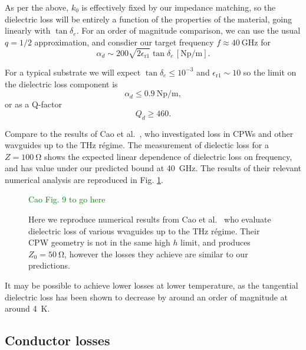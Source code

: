 \documentclass[a4paper]{article}
\newcommand{\ph}[1]{\textcolor{green}{#1}} %
\begin{document}
As per the above, $k_0$ is effectively fixed by our impedance matching, so the
dielectric loss will be entirely a function of the properties of the material,
going linearly with $\tan\delta_e$. For an order of magnitude comparison, we can
use the usual $q=1/2$ approximation, and consdier our target frequency
$f\approx\SI{40}{\giga\hertz}$ for
\begin{equation}
  \alpha_d \sim 200\sqrt{2\epsilon_\mathrm{r1}}\tan\delta_e
  \,[\si{\neper\per\meter}].
\end{equation}

For a typical substrate we will expect $\tan\delta_e\leq10^{-3}$ and
$\epsilon_\mathrm{r1} \sim 10$ so the limit on the dielectric loss component is
\begin{equation}
  \alpha_d \leq \SI{0.9}{\neper\per\meter},
\end{equation}
or as a Q-factor
\begin{equation}
  Q_d \geq 460.
\end{equation}

Compare to the results of  Cao et al.~\cite{L.Cao2013}, who
investigated loss in CPWs and other wavguides up to the \si{\tera\hertz}
r\'egime. The measurement of dielectic loss for a $Z=\SI{100}{\ohm}$ shows the
expected linear dependence of dielectric loss on frequency, and has value under
our predicted bound at \SI{40}{\giga\hertz}. The results of their relevant
numerical analysis are reproduced in Fig. \ref{fig:CaoFig9}.

\begin{figure}
  \ph{Cao Fig. 9 to go here}
  \caption{Here we reproduce numerical results from Cao et al.~\cite{L.Cao2013}
  who evaluate dielectric loss of various wvaguides up to the \si{\tera\hertz}
  r\'egime. Their CPW geometry is not in the same high $h$ limit, and produces
  $Z_0 = \SI{50}{\ohm}$, however the losses they achieve are similar to our
  predictions.
  }
  \label{fig:CaoFig9}
\end{figure}

It may be possible to achieve lower losses at lower temperature, as the
tangential dielectric loss has been shown to decrease by around an order of
magnitude at around \SI{4}{\kelvin}. \cite{1717770}

\subsection{Conductor losses}
\end{document}
